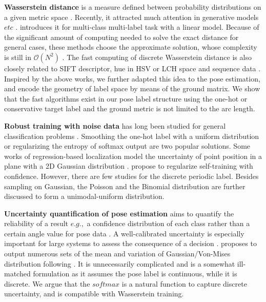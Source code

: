 \noindent\textbf{Wasserstein distance} is a measure defined between probability distributions on a given metric space \cite{kolouri2016sliced}. Recently, it attracted much attention in generative models $etc$ \cite{arjovsky2017wasserstein}. \cite{frogner2015learning} introduces it for multi-class multi-label task with a linear model. Because of the significant amount of computing needed to solve the exact distance for general cases, these methods choose the approximate solution, whose complexity is still in $\mathcal{O}(N^2)$ \cite{cuturi2013sinkhorn}. The fast computing of discrete Wasserstein distance is also closely related to SIFT \cite{cha2002measuring} descriptor, hue in HSV or LCH space \cite{cha2002fast} and sequence data \cite{su2017order}. Inspired by the above works, we further adapted this idea to the pose estimation, and encode the geometry of label space by means of the ground matrix. We show that the fast algorithms exist in our pose label structure using the one-hot or conservative target label and the ground metric is not limited to the arc length. 







\noindent\textbf{Robust training with noise data} has long been studied for general classification problems \cite{huber2011robust}. Smoothing the one-hot label \cite{szegedy2016rethinking} with a uniform distribution or regularizing the entropy of softmax output \cite{pereyra2017regularizing} are two popular solutions. Some works of regression-based localization model the uncertainty of point position in a plane with a 2D Gaussian distribution \cite{szeto2017click}. \cite{zou2019confidence} propose to regularize self-training with confidence. However, there are few studies for the discrete periodic label. Besides sampling on Gaussian, the Poisson and the Binomial distribution are further discussed to form a unimodal-uniform distribution.



\noindent\textbf{Uncertainty quantification of pose estimation} aims to quantify the reliability of a result $e.g.,$ a confidence distribution of each class rather than a certain angle value for pose data \cite{prokudin2018deep}. A well-calibrated uncertainty is especially important for large systems to assess the consequence of a decision \cite{che2019deep,han2019unsupervised}. \cite{prokudin2018deep} proposes to output numerous sets of the mean and variation of Gaussian/Von-Mises distribution following \cite{beyer2015biternion}. It is unnecessarily complicated and is a somewhat ill-matched formulation as it assumes the pose label is continuous, while it is discrete. We argue that the $softmax$ is a natural function to capture discrete uncertainty, and is compatible with Wasserstein training.

